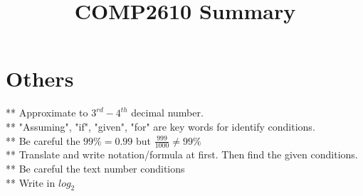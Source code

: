 \documentclass[12pt,a4paper]{extarticle}
\title{COMP2610 Summary}
\begin{document}
\maketitle
\tableofcontents
\section{Others}
** Approximate to $3^{rd}-4^{th}$ decimal number.\\
** "Assuming", "if", "given", "for" are key words for identify conditions.\\
** Be careful the $99 \% = 0.99$ but $\frac{999}{1000} \neq 99\%$\\
** Translate and write notation/formula at first. Then find the given conditions.\\
** Be careful the text number conditions\\
** Write in $log_2$
\end{document}
